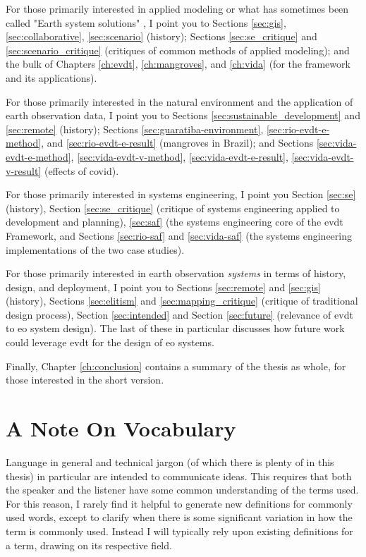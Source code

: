 For those primarily interested in applied modeling or what has sometimes been called "Earth system solutions" \cite{jonesGainingSeatPolicy2002}, I point you to Sections \ref{sec:gis}, \ref{sec:collaborative}, \ref{sec:scenario} (history); Sections \ref{sec:se_critique} and \ref{sec:scenario_critique} (critiques of common methods of applied modeling); and the bulk of Chapters \ref{ch:evdt}, \ref{ch:mangroves}, and \ref{ch:vida} (for the framework and its applications).

For those primarily interested in the natural environment and the application of earth observation data, I point you to Sections \ref{sec:sustainable_development} and \ref{sec:remote} (history); Sections \ref{sec:guaratiba-environment}, \ref{sec:rio-evdt-e-method}, and \ref{sec:rio-evdt-e-result} (mangroves in Brazil); and Sections \ref{sec:vida-evdt-e-method},  \ref{sec:vida-evdt-v-method}, \ref{sec:vida-evdt-e-result}, \ref{sec:vida-evdt-v-result} (effects of \acs{covid}).

For those primarily interested in systems engineering, I point you Section \ref{sec:se} (history), Section \ref{sec:se_critique} (critique of systems engineering applied to development and planning), \ref{sec:saf} (the systems engineering core of the \ac{evdt} Framework, and Sections \ref{sec:rio-saf} and \ref{sec:vida-saf} (the systems engineering implementations of the two case studies).

For those primarily interested in earth observation \textit{systems} in terms of history, design, and deployment, I point you to Sections \ref{sec:remote} and \ref{sec:gis} (history), Sections \ref{sec:elitism} and \ref{sec:mapping_critique} (critique of traditional design process), Section \ref{sec:intended} and Section \ref{sec:future} (relevance of \ac{evdt} to \ac{eo} system design). The last of these in particular discusses how future work could leverage \ac{evdt} for the design of \ac{eo} systems.

Finally, Chapter \ref{ch:conclusion} contains a summary of the thesis as whole, for those interested in the short version.

\section{A Note On Vocabulary} \label{sec:vocabulary}

Language in general and technical jargon (of which there is plenty of in this thesis) in particular are intended to communicate ideas. This requires that both the speaker and the listener have some common understanding of the terms used. For this reason, I rarely find it helpful to generate new definitions for commonly used words, except to clarify when there is some significant variation in how the term is commonly used. Instead I will typically rely upon existing definitions for a term, drawing on its respective field.

